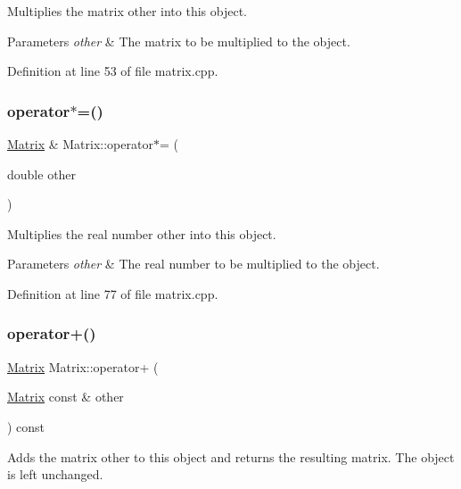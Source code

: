 Multiplies the matrix {\ttfamily other} into this object.


\begin{DoxyParams}{Parameters}
{\em other} & The matrix to be multiplied to the object. \\
\hline
\end{DoxyParams}


Definition at line 53 of file matrix.\+cpp.

\mbox{\label{classMatrix_ad2fd5772e288eb07a404907e6e1a1dd6}} 
\subsubsection{\texorpdfstring{operator$\ast$=()}{operator*=()}\hspace{0.1cm}{\footnotesize\ttfamily [2/2]}}
{\footnotesize\ttfamily \hyperlink{classMatrix}{Matrix} \& Matrix\+::operator$\ast$= (\begin{DoxyParamCaption}\item[{double}]{other }\end{DoxyParamCaption})}

Multiplies the real number {\ttfamily other} into this object.


\begin{DoxyParams}{Parameters}
{\em other} & The real number to be multiplied to the object. \\
\hline
\end{DoxyParams}


Definition at line 77 of file matrix.\+cpp.

\mbox{\label{classMatrix_a2c888c6a7fe7a4ea3b603d17fe3f77e0}} 
\subsubsection{\texorpdfstring{operator+()}{operator+()}}
{\footnotesize\ttfamily \hyperlink{classMatrix}{Matrix} Matrix\+::operator+ (\begin{DoxyParamCaption}\item[{\hyperlink{classMatrix}{Matrix} const \&}]{other }\end{DoxyParamCaption}) const}

Adds the matrix {\ttfamily other} to this object and returns the resulting matrix. The object is left unchanged.


